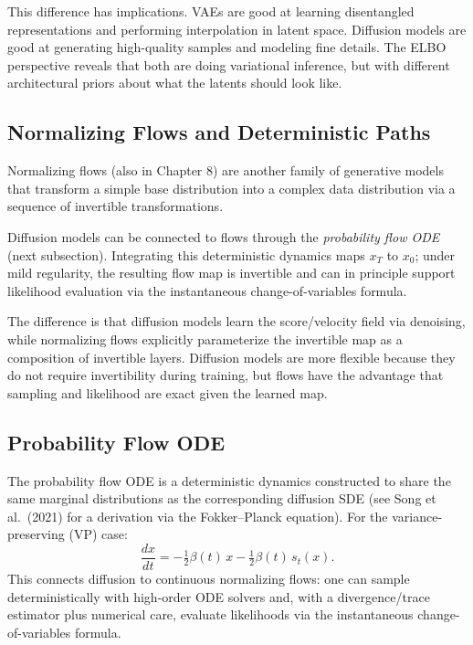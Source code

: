\vspPara

This difference has implications. VAEs are good at learning disentangled representations and performing interpolation in latent space. Diffusion models are good at generating high-quality samples and modeling fine details. The ELBO perspective reveals that both are doing variational inference, but with different architectural priors about what the latents should look like.

\vspSection

\subsection{Normalizing Flows and Deterministic Paths}

Normalizing flows (also in Chapter 8) are another family of generative models that transform a simple base distribution into a complex data distribution via a sequence of invertible transformations.

\vspPara

Diffusion models can be connected to flows through the \emph{probability flow ODE} (next subsection). Integrating this deterministic dynamics maps $x_T$ to $x_0$; under mild regularity, the resulting flow map is invertible and can in principle support likelihood evaluation via the instantaneous change-of-variables formula.

\vspPara

The difference is that diffusion models learn the score/velocity field via denoising, while normalizing flows explicitly parameterize the invertible map as a composition of invertible layers. Diffusion models are more flexible because they do not require invertibility during training, but flows have the advantage that sampling and likelihood are exact given the learned map.

\vspSection


\vspLarge
\subsection{Probability Flow ODE}
The probability flow ODE is a deterministic dynamics constructed to share the same marginal distributions as the corresponding diffusion SDE (see Song et al.\ (2021) for a derivation via the Fokker--Planck equation). For the variance-preserving (VP) case:
$$\frac{dx}{dt} = -\tfrac{1}{2}\beta(t)\,x - \tfrac{1}{2}\beta(t)\,s_t(x).$$
This connects diffusion to continuous normalizing flows: one can sample deterministically with high-order ODE solvers and, with a divergence/trace estimator plus numerical care, evaluate likelihoods via the instantaneous change-of-variables formula.


